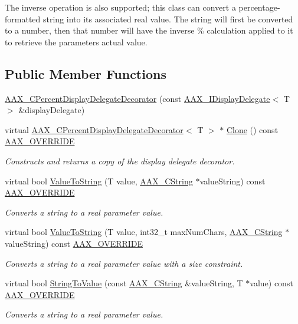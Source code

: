 The inverse operation is also supported; this class can convert a percentage-\/formatted string into its associated real value. The string will first be converted to a number, then that number will have the inverse \% calculation applied to it to retrieve the parameter\textquotesingle{}s actual value. \subsection*{Public Member Functions}
\begin{DoxyCompactItemize}
\item 
\hyperlink{a00036_ab1a468a7025667b8cecbf2fc6f4f7d21}{A\+A\+X\+\_\+\+C\+Percent\+Display\+Delegate\+Decorator} (const \hyperlink{a00092}{A\+A\+X\+\_\+\+I\+Display\+Delegate}$<$ T $>$ \&display\+Delegate)
\item 
virtual \hyperlink{a00036}{A\+A\+X\+\_\+\+C\+Percent\+Display\+Delegate\+Decorator}$<$ T $>$ $\ast$ \hyperlink{a00036_affe52efa34c969895f75b067e875dafb}{Clone} () const \hyperlink{a00149_ac2f24a5172689ae684344abdcce55463}{A\+A\+X\+\_\+\+O\+V\+E\+R\+R\+I\+D\+E}
\begin{DoxyCompactList}\small\item\em Constructs and returns a copy of the display delegate decorator. \end{DoxyCompactList}\item 
virtual bool \hyperlink{a00036_a06407f0b1287891bf658bc4e4166e2e4}{Value\+To\+String} (T value, \hyperlink{a00042}{A\+A\+X\+\_\+\+C\+String} $\ast$value\+String) const \hyperlink{a00149_ac2f24a5172689ae684344abdcce55463}{A\+A\+X\+\_\+\+O\+V\+E\+R\+R\+I\+D\+E}
\begin{DoxyCompactList}\small\item\em Converts a string to a real parameter value. \end{DoxyCompactList}\item 
virtual bool \hyperlink{a00036_a80f4b7189ac37a15550e9f1846fcbfd7}{Value\+To\+String} (T value, int32\+\_\+t max\+Num\+Chars, \hyperlink{a00042}{A\+A\+X\+\_\+\+C\+String} $\ast$value\+String) const \hyperlink{a00149_ac2f24a5172689ae684344abdcce55463}{A\+A\+X\+\_\+\+O\+V\+E\+R\+R\+I\+D\+E}
\begin{DoxyCompactList}\small\item\em Converts a string to a real parameter value with a size constraint. \end{DoxyCompactList}\item 
virtual bool \hyperlink{a00036_a702a4dea21a72dc8edf6b91b5a5bf5e5}{String\+To\+Value} (const \hyperlink{a00042}{A\+A\+X\+\_\+\+C\+String} \&value\+String, T $\ast$value) const \hyperlink{a00149_ac2f24a5172689ae684344abdcce55463}{A\+A\+X\+\_\+\+O\+V\+E\+R\+R\+I\+D\+E}
\begin{DoxyCompactList}\small\item\em Converts a string to a real parameter value. \end{DoxyCompactList}\end{DoxyCompactItemize}



